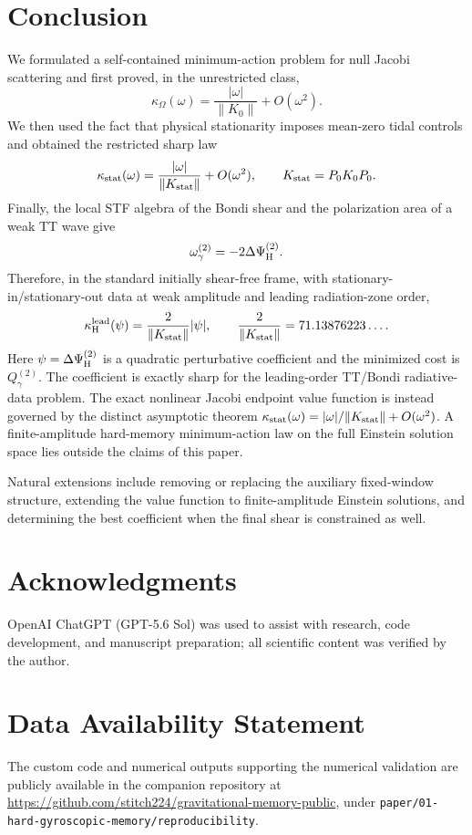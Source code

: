 \section{Conclusion}
We formulated a self-contained minimum-action problem for null Jacobi scattering and first proved, in the unrestricted class,
\[
\kappa_\Omega(\omega)=\frac{|\omega|}{\|K_0\|}+O(\omega^2).
\]
We then used the fact that physical stationarity imposes mean-zero tidal controls and obtained the restricted sharp law
\[
\kappa_{\rm stat}(\omega)=\frac{|\omega|}{\|K_{\rm stat}\|}+O(\omega^2),
\qquad K_{\rm stat}=P_0K_0P_0.
\]
Finally, the local STF algebra of the Bondi shear and the polarization area of a weak TT wave give
\[
\omega_\gamma^{(2)}=-2\Delta\Psi_{\rm H}^{(2)}.
\]
Therefore, in the standard initially shear-free frame, with stationary-in/stationary-out data at weak amplitude and leading radiation-zone order,
\[
\kappa_{\rm H}^{\rm lead}(\psi)=\frac{2}{\|K_{\rm stat}\|}|\psi|,
\qquad
\frac{2}{\|K_{\rm stat}\|}=71.13876223\ldots.
\]
Here $\psi=\Delta\Psi_{\rm H}^{(2)}$ is a quadratic perturbative coefficient and the minimized cost is $Q_\gamma^{(2)}$. The coefficient is exactly sharp for the leading-order TT/Bondi radiative-data problem. The exact nonlinear Jacobi endpoint value function is instead governed by the distinct asymptotic theorem $\kappa_{\rm stat}(\omega)=|\omega|/\|K_{\rm stat}\|+O(\omega^2)$. A finite-amplitude hard-memory minimum-action law on the full Einstein solution space lies outside the claims of this paper.

Natural extensions include removing or replacing the auxiliary fixed-window structure, extending the value function to finite-amplitude Einstein solutions, and determining the best coefficient when the final shear is constrained as well.

\section*{Acknowledgments}
OpenAI ChatGPT (GPT-5.6 Sol) was used to assist with research, code development, and manuscript preparation; all scientific content was verified by the author.

\section*{Data Availability Statement}
The custom code and numerical outputs supporting the numerical validation are publicly available in the companion repository at \url{https://github.com/stitch224/gravitational-memory-public}, under \texttt{paper/01-hard-gyroscopic-memory/reproducibility}.
